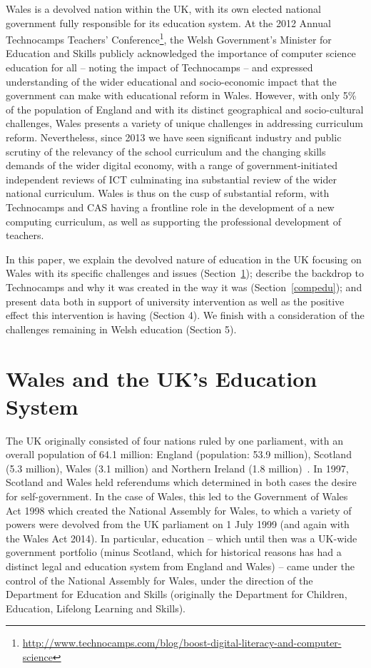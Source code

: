 \documentclass{sig-alternate}
\begin{document}
Wales is a devolved nation within the UK, with its own elected
national government fully responsible for its education system.  At
the 2012 Annual Technocamps Teachers'
Conference\footnote{\url{http://www.technocamps.com/blog/boost-digital-literacy-and-computer-science}},
the Welsh Government's Minister for Education and Skills publicly
acknowledged the importance of computer science education for all --
noting the impact of Technocamps -- and expressed understanding of the
wider educational and socio-economic impact that the government can
make with educational reform in Wales.  However, with only 5\% of the
population of England and with its distinct geographical and
socio-cultural challenges, Wales presents a variety of unique
challenges in addressing curriculum reform. Nevertheless, since 2013
we have seen significant industry and public scrutiny of the relevancy
of the school curriculum and the changing skills demands of the wider
digital economy, with a range of government-initiated independent
reviews of ICT culminating ina substantial review of the wider
national curriculum. Wales is thus on the cusp of substantial reform,
with Technocamps and CAS having a frontline role in the development of
a new computing curriculum, as well as supporting the professional
development of teachers.

In this paper, we explain the devolved nature of education in the UK
focusing on Wales with its specific challenges and issues
(Section~\ref{welshukedu}); describe the backdrop to Technocamps and
why it was created in the way it was (Section~\ref{compedu}); and
present data both in support of university intervention as well as the
positive effect this intervention is having (Section 4).  We finish
with a consideration of the challenges remaining in Welsh education
(Section 5).

\section{Wales and the UK's Education System}\label{welshukedu}

The UK originally consisted of four nations ruled by one parliament,
with an overall population of 64.1 million: England (population: 53.9
million), Scotland (5.3 million), Wales (3.1 million) and Northern
Ireland (1.8 million)~\cite{onspop:2014}. In 1997, Scotland and Wales
held referendums which determined in both cases the desire for
self-government.  In the case of Wales, this led to the Government of
Wales Act 1998 which created the National Assembly for Wales, to which
a variety of powers were devolved from the UK parliament on 1 July
1999 (and again with the Wales Act 2014).  In particular, education --
which until then was a UK-wide government portfolio (minus Scotland,
which for historical reasons has had a distinct legal and education
system from England and Wales) -- came under the control of the
National Assembly for Wales, under the direction of the Department for
Education and Skills (originally the Department for Children,
Education, Lifelong Learning and Skills).
\end{document}

